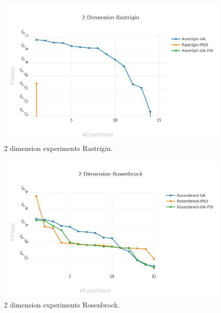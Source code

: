 \documentclass[runningheads]{llncs}
\begin{document}
\begin{figure}[htp]
  \includegraphics[width=\textwidth]{2-rastrigin.jpg}
  \caption{2 dimension experiments Rastrigin.} \label{fig1}
  \end{figure}
  
\begin{figure}[htp]
  \includegraphics[width=\textwidth]{2-rosenbrock.jpg}
  \caption{2 dimension experiments Rosenbrock.} \label{fig1}
  \end{figure}
\end{document}
